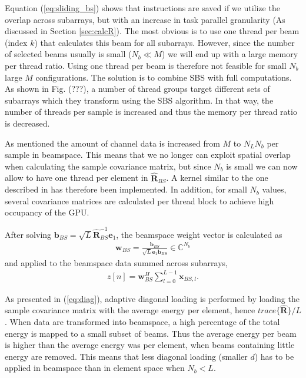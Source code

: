 \documentclass[12pt,journal,onecolumn]{IEEEtran}
\newcommand{\mat}[1]{\mathbf{#1}}
\renewcommand{\vec}[1]{\mathbf{#1}}
\begin{document}
Equation (\ref{eq:sliding_bs}) shows that instructions are saved if we utilize the overlap across subarrays, but with an increase in task parallel granularity (As discussed in Section \ref{sec:calcR}). The most obvious is to use one thread per beam (index $k$) that calculates this beam for all subarrays. However, since the number of selected beams usually is small ($N_b \ll M$) we will end up with a large memory per thread ratio. Using one thread per beam is therefore not feasible for small $N_b$ large $M$ configurations. The solution is to combine SBS with full computations. As shown in Fig. (???), a number of thread groups target different sets of subarrays which they transform using the SBS algorithm. In that way, the number of threads per sample is increased and thus the memory per thread ratio is decreased. 

As mentioned the amount of channel data is increased from $M$ to $N_LN_b$ per sample in beamspace. This means that we no longer can exploit spatial overlap when calculating the sample covariance matrix, but since $N_b$ is small we can now allow to have one thread per element in $\mat{\hat{R}}_{BS}$. A kernel similar to the one described in \cite{Chen2011} has therefore been implemented. In addition, for small $N_b$ values, several covariance matrices are calculated per thread block to achieve high occupancy of the GPU.

After solving $\vec{b}_{BS} = \sqrt{L}\mat{\hat{R}}_{BS}^{-1}\vec{e}_1$, the beamspace weight vector is calculated as 
\begin{align}
\vec{w}_{BS} = \frac{\vec{b}_{BS}}{\sqrt{L}\vec{e}_1\vec{b}_{BS}} \in \mathbb{C}^{N_b}
\end{align}  
and applied to the beamspace data summed across subarrays,
\begin{align}
z[n] = \vec{w}_{BS}^H\sum_{l=0}^{L-1}\vec{x}_{BS,l}. 
\end{align}


As presented in (\ref{eq:diag}), adaptive diagonal loading is performed by loading the sample covariance matrix with the average energy per element, hence $trace\{\mat{\hat{R}}\}/L$. When data are transformed into beamspace, a high percentage of the total energy is mapped to a small subset of beams. Thus the average energy per beam is higher than the average energy was per element, when beams containing little energy are removed. This means that less diagonal loading (smaller $d$) has to be applied in beamspace than in element space when $N_b < L$.
\end{document}
